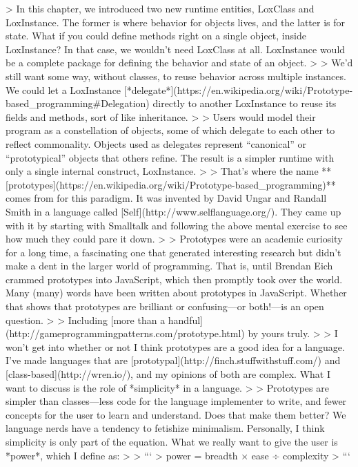 \documentclass[cn,11pt,chinese]{elegantbook}
\begin{document}
{{{{{{{{{{{{{{{{{{{{{{{{{{{> In this chapter, we introduced two new runtime entities, LoxClass and LoxInstance. The former is where behavior for objects lives, and the latter is for state. What if you could define methods right on a single object, inside LoxInstance? In that case, we wouldn’t need LoxClass at all. LoxInstance would be a complete package for defining the behavior and state of an object.
>
> We’d still want some way, without classes, to reuse behavior across multiple instances. We could let a LoxInstance [*delegate*](https://en.wikipedia.org/wiki/Prototype-based_programming#Delegation) directly to another LoxInstance to reuse its fields and methods, sort of like inheritance.
>
> Users would model their program as a constellation of objects, some of which delegate to each other to reflect commonality. Objects used as delegates represent “canonical” or “prototypical” objects that others refine. The result is a simpler runtime with only a single internal construct, LoxInstance.
>
> That’s where the name **[prototypes](https://en.wikipedia.org/wiki/Prototype-based_programming)** comes from for this paradigm. It was invented by David Ungar and Randall Smith in a language called [Self](http://www.selflanguage.org/). They came up with it by starting with Smalltalk and following the above mental exercise to see how much they could pare it down.
>
> Prototypes were an academic curiosity for a long time, a fascinating one that generated interesting research but didn’t make a dent in the larger world of programming. That is, until Brendan Eich crammed prototypes into JavaScript, which then promptly took over the world. Many (many) words have been written about prototypes in JavaScript. Whether that shows that prototypes are brilliant or confusing—or both!—is an open question.
>
> Including [more than a handful](http://gameprogrammingpatterns.com/prototype.html) by yours truly.
>
> I won’t get into whether or not I think prototypes are a good idea for a language. I’ve made languages that are [prototypal](http://finch.stuffwithstuff.com/) and [class-based](http://wren.io/), and my opinions of both are complex. What I want to discuss is the role of *simplicity* in a language.
>
> Prototypes are simpler than classes—less code for the language implementer to write, and fewer concepts for the user to learn and understand. Does that make them better? We language nerds have a tendency to fetishize minimalism. Personally, I think simplicity is only part of the equation. What we really want to give the user is *power*, which I define as:
>
> ```
> power = breadth × ease ÷ complexity
> ```
}}}}}}}}}}}}}}}}}}}}}}}}}}}
\end{document}
